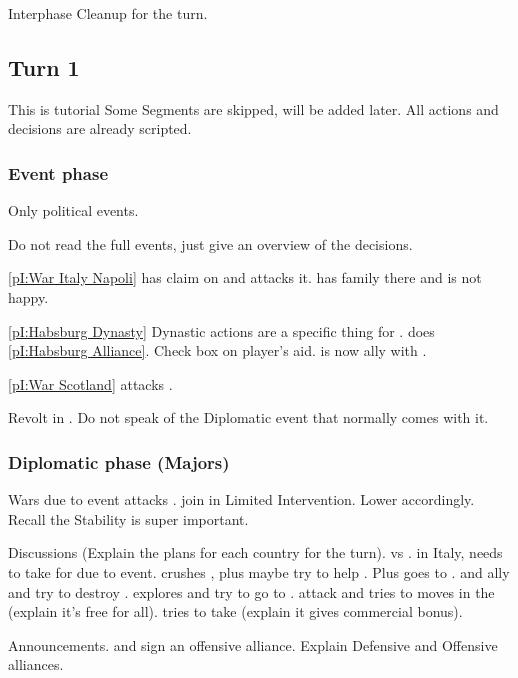 \aparag Interphase
\bparag Cleanup for the turn.

\subsection{Turn 1}
\aparag This is tutorial
\bparag Some Segments are skipped, will be added later.
\bparag All actions and decisions are already scripted.

\subsubsection{Event phase}
\aparag Only political events.

\aparag Do not read the full events, just give an overview of the decisions.

\aparag \ref{pI:War Italy Napoli}
\bparag \FRA has claim on  and attacks it. \HIS has family there
and is not happy.

\aparag \ref{pI:Habsburg Dynasty}
\bparag Dynastic actions are a specific thing for \HIS.
\bparag \HIS does \ref{pI:Habsburg Alliance}. Check box on player's aid.
\bparag \HIS is now ally with \paysHabsbourg.

\aparag \ref{pI:War Scotland}
\bparag \paysEcosse attacks \ANG.

\aparag Revolt
\bparag \REVOLT\facemoins in \provinceCatalogne.
\bparag Do not speak of the Diplomatic event that normally comes with it.

\subsubsection{Diplomatic phase (Majors)}
\aparag Wars due to event
\bparag \FRA attacks \paysNaples. \HIS join in Limited Intervention.
\bparag Lower \STAB accordingly. Recall the Stability is super important.

\aparag Discussions (Explain the plans for each country for the turn).
\bparag \ANG vs \paysEcosse.
\bparag \FRA in Italy, needs to take \villeNaples for \VPs due to event.
\bparag \HIS crushes \REVOLT, plus maybe try to help \paysNaples. Plus goes to
\continentAmerica.
\bparag \POL and \RUS ally and try to destroy \paysDon.
\bparag \POR explores and try to go to \continentIndia.
\bparag \TUR attack \paysGeorgie and tries to moves in the \regionBalkans
(explain it's free for all).
\bparag \VEN tries to take \villeRaguse (explain it gives commercial bonus).

\aparag Announcements.
\bparag \RUS and \POL sign an offensive alliance.
\bparag Explain Defensive and Offensive alliances.

